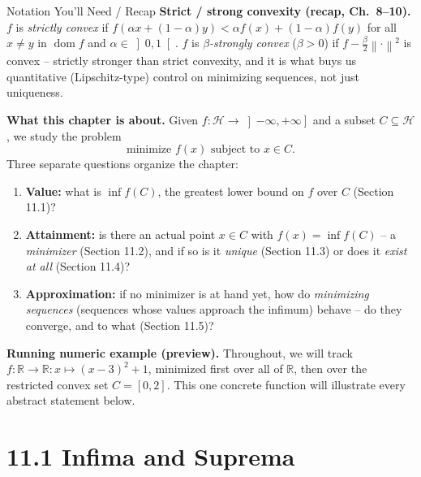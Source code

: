 \documentclass[aspectratio=169,10pt]{beamer}
\newcommand{\mHH}{\mathcal H}
\newcommand{\norm}[1]{\left\|#1\right\|}
\newcommand{\R}{\mathbb{R}}
\newcommand{\dom}{\operatorname{dom}}
\begin{document}
\begin{frame}[allowframebreaks]{Notation You'll Need / Recap}
  \textbf{Strict / strong convexity (recap, Ch.\ 8--10).} $f$ is
  \emph{strictly convex} if
  $f(\alpha x+(1-\alpha)y)<\alpha f(x)+(1-\alpha)f(y)$ for all
  $x\neq y$ in $\dom f$ and $\alpha\in\left]0,1\right[$. $f$ is
  \emph{$\beta$-strongly convex} ($\beta>0$) if $f-\tfrac\beta2\norm{\cdot}^2$
  is convex -- strictly stronger than strict convexity, and it is
  what buys us quantitative (Lipschitz-type) control on minimizing
  sequences, not just uniqueness.

  \framebreak

  \textbf{What this chapter is about.} Given $f:\mHH\to\left]-\infty,+\infty\right]$
  and a subset $C\subseteq\mHH$, we study the problem
  \[
    \text{minimize } f(x) \text{ subject to } x\in C.
  \]
  Three separate questions organize the chapter:
  \begin{enumerate}
    \item \textbf{Value:} what is $\inf f(C)$, the greatest lower
          bound on $f$ over $C$ (Section 11.1)?
    \item \textbf{Attainment:} is there an actual point $x\in C$
          with $f(x)=\inf f(C)$ -- a \emph{minimizer} (Section 11.2),
          and if so is it \emph{unique} (Section 11.3) or does it
          \emph{exist at all} (Section 11.4)?
    \item \textbf{Approximation:} if no minimizer is at hand yet, how
          do \emph{minimizing sequences} (sequences whose values
          approach the infimum) behave -- do they converge, and to
          what (Section 11.5)?
  \end{enumerate}

  \textbf{Running numeric example (preview).} Throughout, we will
  track $f:\R\to\R:x\mapsto (x-3)^2+1$, minimized first over all of
  $\R$, then over the restricted convex set $C=[0,2]$. This one
  concrete function will illustrate every abstract statement below.

\end{frame}

\section{11.1 Infima and Suprema}
\end{document}
